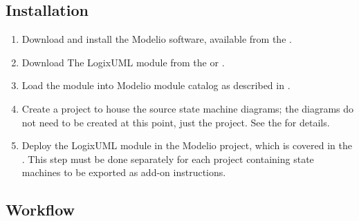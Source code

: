 \subsection{Installation}

\begin{enumerate}
  \item Download and install the Modelio software, available from the
    \textcite{MODELIO}.

  \item Download The LogixUML module from the \textcite{MODELIOSTORE} or
    \textcite{REPO}.

  \item Load the module into Modelio module catalog as described in
    \textcite[Macros catalog]{MODELIOMANUAL}.

  \item Create a project to house the source state machine diagrams;
    the diagrams do not need to be created at this point, just the project.
    See the \textcite[Creating a project]{MODELIOMANUAL} for details.

  \item Deploy the LogixUML module in the Modelio project, which is covered
    in the \textcite[Configuring project modules]{MODELIOMANUAL}.
    This step must be done separately for each project containing state
    machines to be exported as add-on instructions.
\end{enumerate}


\subsection{Workflow}
